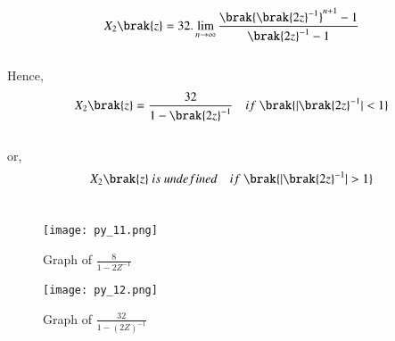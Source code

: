 \documentclass[beamer]{IEEEtran}
\theoremstyle{remark}
\begin{document}
\begin{align}X_2\brak{z}=32.\lim_{n\to\infty} \frac{\brak{\brak{2z}^{-1}}^{n+1}-1}{{\brak{2z}^{-1}}-1}\end{align}\\
Hence,\\
\begin{align}X_2\brak{z}=\frac{32}{1-{\brak{2z}^{-1}}}\quad if\ \brak{|{\brak{2z}^{-1}}|<1}\end{align}\\
or,\\
$$X_2\brak{z}\ is\ undefined\quad if\ \brak{|{\brak{2z}^{-1}}|>1}$$\\
\begin{figure}[h]
    \centering
    \texttt{[image: py\_11.png]}
    \label{fig:enter-label}
    \caption*{Graph of $\frac{8}{1-2Z^{-1}}$}
\end{figure}
\begin{figure}[h]
    \centering
    \texttt{[image: py\_12.png]}
    \label{fig:enter-label}
    \caption*{Graph of $\frac{32}{1-\left(2Z\right)^{-1}}$}
\end{figure}
\end{document}
